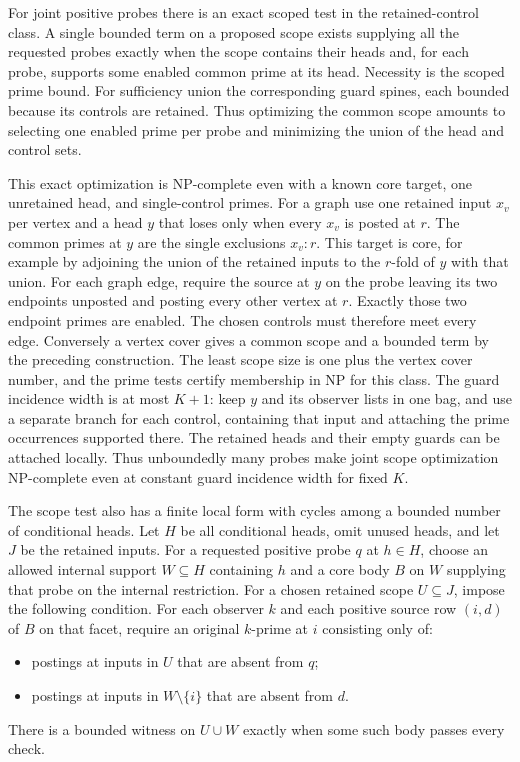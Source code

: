 For joint positive probes there is an exact scoped test in the
retained-control class. A single bounded term on a proposed
scope exists supplying all the requested probes exactly when
the scope contains their heads and, for each probe, supports
some enabled common prime at its head. Necessity is the scoped
prime bound. For sufficiency union the corresponding guard
spines, each bounded because its controls are retained. Thus
optimizing the common scope amounts to selecting one enabled
prime per probe and minimizing the union of the head and
control sets.

This exact optimization is NP-complete even with a known
core target, one unretained head, and single-control primes.
For a graph use one retained input $x_v$ per vertex and a
head $y$ that loses only when every $x_v$ is posted at $r$.
The common primes at $y$ are the single exclusions $x_v:r$.
This target is core, for example by adjoining the union of
the retained inputs to the $r$-fold of $y$ with that union.
For each graph edge, require the source at $y$ on the probe
leaving its two endpoints unposted and posting every other
vertex at $r$. Exactly those two endpoint primes are enabled.
The chosen controls must therefore meet every edge. Conversely
a vertex cover gives a common scope and a bounded term by
the preceding construction. The least scope size is one
plus the vertex cover number, and the prime tests certify
membership in NP for this class. The guard
incidence width is at most $K+1$: keep $y$
and its observer lists in one bag, and use a
separate branch for each control, containing
that input and attaching the prime occurrences
supported there. The retained heads and their
empty guards can be attached locally. Thus
unboundedly many probes make joint scope
optimization NP-complete even at constant
guard incidence width for fixed $K$.

The scope test also has a finite local form with
cycles among a bounded number of conditional
heads. Let $H$ be all conditional heads, omit
unused heads, and let $J$ be the retained inputs.
For a requested positive probe $q$ at $h\in H$,
choose an allowed internal support $W\subseteq H$
containing $h$ and a core body $B$ on $W$ supplying
that probe on the internal restriction. For a
chosen retained scope $U\subseteq J$, impose the
following condition. For each observer $k$ and
each positive source row $(i,d)$ of $B$ on that
facet, require an original $k$-prime at $i$
consisting only of:
\begin{itemize}
\item postings at inputs in $U$ that are absent
      from $q$;
\item postings at inputs in $W\setminus\{i\}$
      that are absent from $d$.
\end{itemize}
There is a bounded witness on $U\cup W$ exactly
when some such body passes every check.

